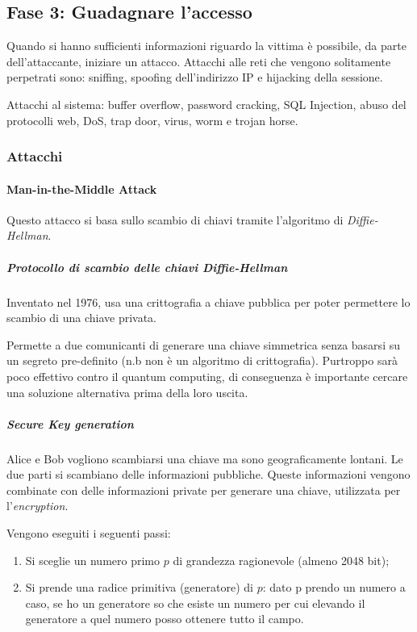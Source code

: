 \subsection{Fase 3: Guadagnare l'accesso}

Quando si hanno sufficienti informazioni riguardo la vittima è possibile, da
parte dell'attaccante, iniziare un attacco.
Attacchi alle reti che vengono solitamente perpetrati sono: sniffing, spoofing 
dell'indirizzo IP e hijacking della sessione.

Attacchi al sistema: buffer overflow, password cracking, SQL Injection, abuso 
del protocolli web, DoS, trap door, virus, worm e trojan horse.

\subsubsection{Attacchi}

\paragraph{Man-in-the-Middle Attack}

Questo attacco si basa sullo scambio di chiavi tramite l'algoritmo di
\textit{Diffie-Hellman}.

\subparagraph{Protocollo di scambio delle chiavi Diffie-Hellman}

Inventato nel 1976, usa una crittografia a chiave pubblica per poter 
permettere lo scambio di una chiave privata.

Permette a due comunicanti di generare una chiave simmetrica senza basarsi su
un segreto pre-definito (n.b non è un algoritmo di crittografia).
Purtroppo sarà poco effettivo contro il quantum computing, di conseguenza è 
importante cercare una soluzione alternativa prima della loro uscita.

\subparagraph{Secure Key generation}

Alice e Bob vogliono scambiarsi una chiave ma sono geograficamente lontani.
Le due parti si scambiano delle informazioni pubbliche. Queste informazioni
vengono combinate con delle informazioni private per generare una chiave,
utilizzata per l'\textit{encryption}.


Vengono eseguiti i seguenti passi:

\begin{enumerate}
 \item Si sceglie un numero primo $p$ di grandezza ragionevole (almeno 2048
 bit);
 \item Si prende una radice primitiva (generatore) di $p$: dato p prendo un
 numero a caso, se ho un generatore so che esiste un numero per cui elevando il
 generatore a quel numero posso ottenere tutto il campo.
\end{enumerate}

